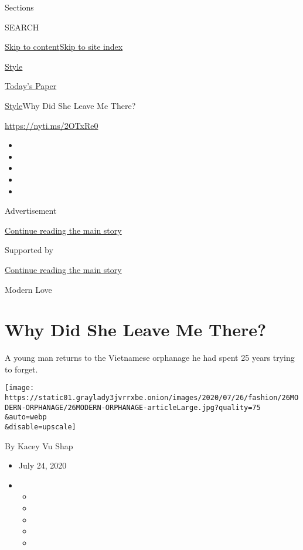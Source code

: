 Sections

SEARCH

\protect\hyperlink{site-content}{Skip to
content}\protect\hyperlink{site-index}{Skip to site index}

\href{https://www.nytimes3xbfgragh.onion/section/style}{Style}

\href{https://myaccount.nytimes3xbfgragh.onion/auth/login?response_type=cookie\&client_id=vi}{}

\href{https://www.nytimes3xbfgragh.onion/section/todayspaper}{Today's
Paper}

\href{/section/style}{Style}\textbar{}Why Did She Leave Me There?

\url{https://nyti.ms/2OTxRe0}

\begin{itemize}
\item
\item
\item
\item
\item
\end{itemize}

Advertisement

\protect\hyperlink{after-top}{Continue reading the main story}

Supported by

\protect\hyperlink{after-sponsor}{Continue reading the main story}

Modern Love

\hypertarget{why-did-she-leave-me-there}{%
\section{Why Did She Leave Me There?}\label{why-did-she-leave-me-there}}

A young man returns to the Vietnamese orphanage he had spent 25 years
trying to forget.

\texttt{[image: https://static01.graylady3jvrrxbe.onion/images/2020/07/26/fashion/26MODERN-ORPHANAGE/26MODERN-ORPHANAGE-articleLarge.jpg?quality=75\\\&auto=webp\\\&disable=upscale]}

By Kacey Vu Shap

\begin{itemize}
\item
  July 24, 2020
\item
  \begin{itemize}
  \item
  \item
  \item
  \item
  \item
  \end{itemize}
\end{itemize}

